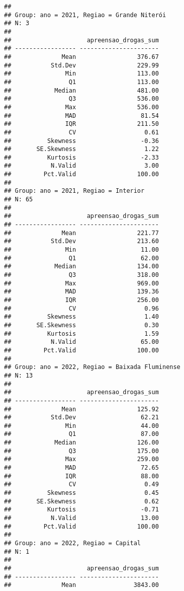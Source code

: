 \documentclass[
]{article}
\begin{document}
\begin{verbatim}
## 
## Group: ano = 2021, Regiao = Grande Niterói  
## N: 3  
## 
##                     apreensao_drogas_sum
## ----------------- ----------------------
##              Mean                 376.67
##           Std.Dev                 229.99
##               Min                 113.00
##                Q1                 113.00
##            Median                 481.00
##                Q3                 536.00
##               Max                 536.00
##               MAD                  81.54
##               IQR                 211.50
##                CV                   0.61
##          Skewness                  -0.36
##       SE.Skewness                   1.22
##          Kurtosis                  -2.33
##           N.Valid                   3.00
##         Pct.Valid                 100.00
## 
## Group: ano = 2021, Regiao = Interior  
## N: 65  
## 
##                     apreensao_drogas_sum
## ----------------- ----------------------
##              Mean                 221.77
##           Std.Dev                 213.60
##               Min                  11.00
##                Q1                  62.00
##            Median                 134.00
##                Q3                 318.00
##               Max                 969.00
##               MAD                 139.36
##               IQR                 256.00
##                CV                   0.96
##          Skewness                   1.40
##       SE.Skewness                   0.30
##          Kurtosis                   1.59
##           N.Valid                  65.00
##         Pct.Valid                 100.00
## 
## Group: ano = 2022, Regiao = Baixada Fluminense  
## N: 13  
## 
##                     apreensao_drogas_sum
## ----------------- ----------------------
##              Mean                 125.92
##           Std.Dev                  62.21
##               Min                  44.00
##                Q1                  87.00
##            Median                 126.00
##                Q3                 175.00
##               Max                 259.00
##               MAD                  72.65
##               IQR                  88.00
##                CV                   0.49
##          Skewness                   0.45
##       SE.Skewness                   0.62
##          Kurtosis                  -0.71
##           N.Valid                  13.00
##         Pct.Valid                 100.00
## 
## Group: ano = 2022, Regiao = Capital  
## N: 1  
## 
##                     apreensao_drogas_sum
## ----------------- ----------------------
##              Mean                3843.00

\end{verbatim}
\end{document}
